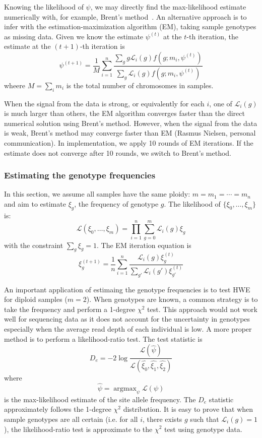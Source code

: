 \documentclass{bioinfo}
\DeclareMathOperator*{\argmax}{argmax}
\begin{document}
\begin{methods}
Knowing the likelihood of $\psi$, we may directly find the max-likelihood estimate
numerically with, for example, Brent's method~\citep{Brent:1973kx}. An alternative approach is to 
infer with the estimation-maximization algorithm (EM), taking sample genotypes as missing data. Given
we know the estimate $\psi^{(t)}$ at the $t$-th iteration, the estimate at the $(t+1)$-th
iteration is
\begin{equation}\label{eq:saf-em}
\psi^{(t+1)}=\frac{1}{M}\sum_{i=1}^n\frac{\sum_{g}g\mathcal{L}_i(g)f(g;m_i,\psi^{(t)})}{\sum_{g}\mathcal{L}_i(g)f(g;m_i,\psi^{(t)})}
\end{equation}
wheere $M=\sum_im_i$ is the total number of chromosomes in samples.

When the signal from the data is strong, or equivalently for each $i$, one of $\mathcal{L}_i(g)$
is much larger than others, the EM algorithm converges faster than the direct numerical
solution using Brent's method. However, when the signal from the data is weak,
Brent's method may converge faster than EM (Rasmus Nielsen, personal communication). In implementation, we apply 10 rounds of
EM iterations. If the estimate does not converge after 10 rounds, we switch to Brent's method.

\subsubsection{Estimating the genotype frequencies}
In this section, we assume all samples have the same ploidy: $m=m_1=\cdots=m_n$
and aim to estimate $\xi_g$, the frequency of genotype $g$. The likelihood
of $\{\xi_0,\ldots,\xi_m\}$ is:
\begin{equation}
\mathcal{L}(\xi_0,\ldots,\xi_m)=\prod_{i=1}^n\sum_{g=0}^{m}\mathcal{L}_i(g)\xi_g
\end{equation}
with the constraint $\sum_g\xi_g=1$. The EM iteration equation is
\begin{equation}\label{eq:sgf-em}
\xi^{(t+1)}_g=\frac{1}{n}\sum_{i=1}^n\frac{\mathcal{L}_i(g)\xi^{(t)}_g}{\sum_{g'}\mathcal{L}_i(g')\xi_{g'}^{(t)}}
\end{equation}

An important application of estimaing the genotype frequencies is to test HWE for diploid samples ($m=2$).
When genotypes are known, a common strategy is to take the frequency and perform a 1-degree $\chi^2$ test. This
approach would not work well for sequencing data as it does not account for the uncertainty in
genotypes especially when the average read depth of each individual is low. A more proper
method is to perform a likelihood-ratio test. The test statistic is
$$
D_e=-2\log\frac{\mathcal{L}(\hat{\psi})}{\mathcal{L}(\hat{\xi_0},\hat{\xi_1},\hat{\xi_2})}
$$
where
\begin{equation}\label{eq:psimax}
\hat{\psi}=\argmax_{\psi}\mathcal{L}(\psi)
\end{equation}
is the max-likelihood estimate of the site allele frequency.
The $D_e$ statistic approximately follows the 1-degree $\chi^2$ distribution.
It is easy to prove that when sample genotypes are all certain (i.e. for all $i$, there exists
$g$ such that $\mathcal{L}_i(g)=1$), the likelihood-ratio test
is approximate to the $\chi^2$ test using genotype data.


\end{methods}
\end{document}
